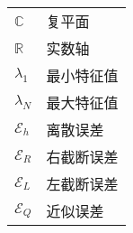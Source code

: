 \begin{symboldescription}


		\begin{tabularx}{\textwidth}{X X }
			 
			 $\mathbb{C}$ & 复平面 \\
			 $\mathbb{R}$ & 实数轴 \\
			 $\lambda_{1}$ & 最小特征值 \\
			 $\lambda_{N}$ & 最大特征值 \\
			 $\mathcal{E}_h$ & 离散误差 \\
			 $\mathcal{E}_R$ & 右截断误差 \\
			 $\mathcal{E}_L$ & 左截断误差 \\
			 $\mathcal{E}_Q$ & 近似误差 \\
		\end{tabularx}
\end{symboldescription}




